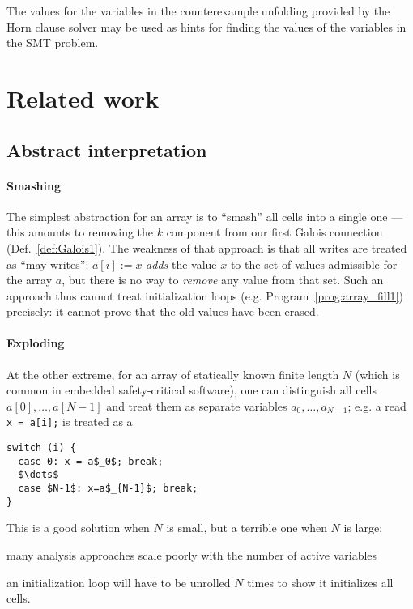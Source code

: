 \documentclass[a4paper]{article}
\theoremstyle{definition}
\theoremstyle{plain}
\begin{document}
The values for the variables in the counterexample unfolding provided by the Horn clause solver may be used as hints for finding the values of the variables in the SMT problem.

\section{Related work}
\label{sec:related}

\subsection{Abstract interpretation}\label{sec:related_absint}
\paragraph{Smashing}
The simplest abstraction for an array is to ``smash'' all cells into a single one ---
this amounts to removing the $k$ component from our first Galois connection (Def.~\ref{def:Galois1}).
The weakness of that approach is that all writes are treated as ``may writes'': $a[i]:=x$ \emph{adds} the value $x$ to the set of values admissible for the array $a$, but there is no way to \emph{remove} any value from that set.
Such an approach thus cannot treat initialization loops (e.g. Program~\ref{prog:array_fill1}) precisely: it cannot prove that the old values have been erased.

\paragraph{Exploding}
At the other extreme, for an array of statically known finite length $N$ (which is common in embedded safety-critical software), one can distinguish all cells $a[0], \dots, a[N-1]$ and treat them as separate variables $a_0, \dots, a_{N-1}$;
e.g. a read \lstinline|x = a[i];| is treated as a
{\small
\begin{lstlisting}[mathescape=true]
switch (i) {
  case 0: x = a$_0$; break;
  $\dots$
  case $N-1$: x=a$_{N-1}$; break;
}
\end{lstlisting}}
This is a good solution when $N$ is small, but a terrible one when $N$ is large:
\begin{inparaenum}
\item many analysis approaches scale poorly with the number of active variables
\item an initialization loop will have to be unrolled $N$ times to show it initializes all cells.
\end{inparaenum}
\end{document}
